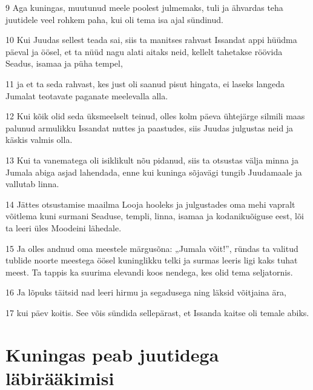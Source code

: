 \par 9 Aga kuningas, muutunud meele poolest julmemaks, tuli ja ähvardas teha juutidele veel rohkem paha, kui oli tema isa ajal sündinud.
\par 10 Kui Juudas sellest teada sai, siis ta manitses rahvast Issandat appi hüüdma päeval ja öösel, et ta nüüd nagu alati aitaks neid, kellelt tahetakse röövida Seadus, isamaa ja püha tempel,
\par 11 ja et ta seda rahvast, kes just oli saanud pisut hingata, ei laseks langeda Jumalat teotavate paganate meelevalla alla.
\par 12 Kui kõik olid seda üksmeelselt teinud, olles kolm päeva ühtejärge silmili maas palunud armulikku Issandat nuttes ja paastudes, siis Juudas julgustas neid ja käskis valmis olla.
\par 13 Kui ta vanematega oli isiklikult nõu pidanud, siis ta otsustas välja minna ja Jumala abiga asjad lahendada, enne kui kuninga sõjavägi tungib Juudamaale ja vallutab linna.
\par 14 Jättes otsustamise maailma Looja hooleks ja julgustades oma mehi vapralt võitlema kuni surmani Seaduse, templi, linna, isamaa ja kodanikuõiguse eest, lõi ta leeri üles Moodeini lähedale.
\par 15 Ja olles andnud oma meestele märgusõna: „Jumala võit!”, ründas ta valitud tublide noorte meestega öösel kuninglikku telki ja surmas leeris ligi kaks tuhat meest. Ta tappis ka suurima elevandi koos nendega, kes olid tema seljatornis.
\par 16 Ja lõpuks täitsid nad leeri hirmu ja segadusega ning läksid võitjaina ära,
\par 17 kui päev koitis. See võis sündida sellepärast, et Issanda kaitse oli temale abiks.


\section*{Kuningas peab juutidega läbirääkimisi}

